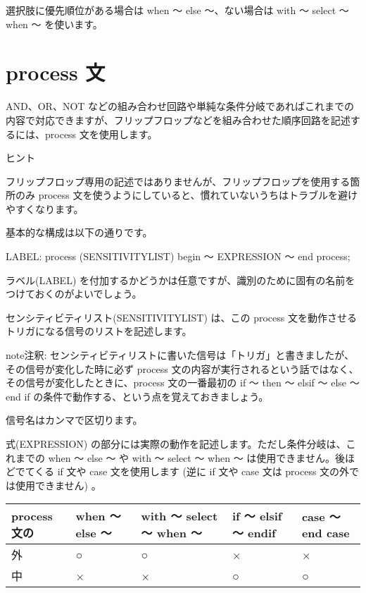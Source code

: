 \documentclass[letterpaper,10pt,dvipdfmx]{sphinxmanual}
\begin{document}
選択肢に優先順位がある場合は when ～ else ～、ない場合は with ～ select ～ when ～ を使います。


\section{process 文}
\label{\detokenize{05_try:process}}
AND、OR、NOT などの組み合わせ回路や単純な条件分岐であればこれまでの内容で対応できますが、フリップフロップなどを組み合わせた順序回路を記述するには、process 文を使用します。

ヒント

フリップフロップ専用の記述ではありませんが、フリップフロップを使用する箇所のみ process 文を使うようにしていると、慣れていないうちはトラブルを避けやすくなります。

基本的な構成は以下の通りです。

\begin{sphinxVerbatim}[commandchars=\\\{\}]
LABEL: process (SENSITIVITY\PYGZhy{}LIST)
begin
  ～ EXPRESSION ～
end process;
\end{sphinxVerbatim}

ラベル(LABEL) を付加するかどうかは任意ですが、識別のために固有の名前をつけておくのがよいでしょう。

センシティビティリスト(SENSITIVITY\sphinxhyphen{}LIST) は、この process 文を動作させるトリガになる信号のリストを記述します。

\begin{sphinxadmonition}{note}{注釈:}
センシティビティリストに書いた信号は「トリガ」と書きましたが、その信号が変化した時に必ず process 文の内容が実行されるという話ではなく、その信号が変化したときに、process 文の一番最初の if ～ then ～ elsif ～ else ～ end if の条件で動作する、という点を覚えておきましょう。
\end{sphinxadmonition}

信号名はカンマで区切ります。

式(EXPRESSION) の部分には実際の動作を記述します。ただし条件分岐は、これまでの when ～ else ～ や with ～ select ～ when ～ は使用できません。後ほどでてくる if 文や case 文を使用します (逆に if 文や case 文は process 文の外では使用できません) 。


\begin{savenotes}\sphinxattablestart
\centering
{}
\sphinxthecaptionisattop
{}\label{\detokenize{05_try:id36}}
\sphinxaftertopcaption
\begin{tabulary}{\linewidth}[t]{|T|T|T|T|T|}
\hline
\sphinxstyletheadfamily 
process 文の
&\sphinxstyletheadfamily 
when ～ else ～
&\sphinxstyletheadfamily 
with ～ select ～ when ～
&\sphinxstyletheadfamily 
if ～ elsif ～ endif
&\sphinxstyletheadfamily 
case ～ end case
\\
\hline
外
&
○
&
○
&
×
&
×
\\
\hline
中
&
×
&
×
&
○
&
○
\\
\hline
\end{tabulary}
\par
\sphinxattableend\end{savenotes}
\end{document}
